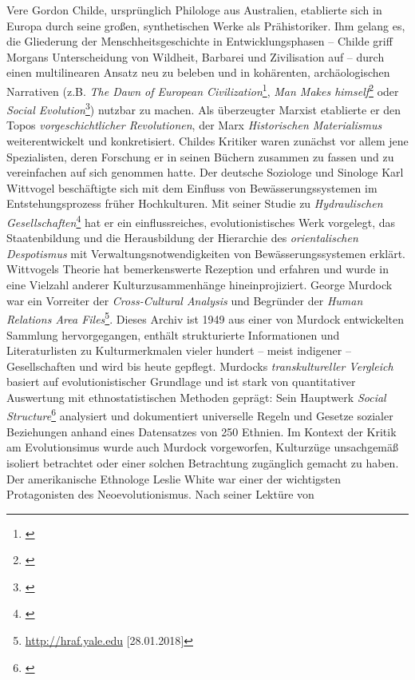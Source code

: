 \documentclass[openany,twoside,twocolumn]{book}
\let\rmarkdownfootnote\footnote%
\def\footnote{\protect\rmarkdownfootnote}
\begin{document}
Vere Gordon Childe, ursprünglich Philologe aus Australien, etablierte
sich in Europa durch seine großen, synthetischen Werke als
Prähistoriker. Ihm gelang es, die Gliederung der Menschheitsgeschichte
in Entwicklungsphasen -- Childe griff Morgans Unterscheidung von
Wildheit, Barbarei und Zivilisation auf -- durch einen multilinearen
Ansatz neu zu beleben und in kohärenten, archäologischen Narrativen
(z.B. \emph{The Dawn of European Civilization}\footnote{\textcite{childe_dawn_1925}},
\emph{Man Makes himself}\footnote{\textcite{childe_man_1936}} oder
\emph{Social Evolution}\footnote{\textcite{childe_social_1951}}) nutzbar
zu machen. Als überzeugter Marxist etablierte er den Topos
\emph{vorgeschichtlicher Revolutionen}, der Marx \emph{Historischen
Materialismus} weiterentwickelt und konkretisiert. Childes Kritiker
waren zunächst vor allem jene Spezialisten, deren Forschung er in seinen
Büchern zusammen zu fassen und zu vereinfachen auf sich genommen hatte.
Der deutsche Soziologe und Sinologe Karl Wittvogel beschäftigte sich mit
dem Einfluss von Bewässerungssystemen im Entstehungsprozess früher
Hochkulturen. Mit seiner Studie zu \emph{Hydraulischen
Gesellschaften}\footnote{\textcite{wittfogel_oriental_1957}} hat er ein
einflussreiches, evolutionistisches Werk vorgelegt, das Staatenbildung
und die Herausbildung der Hierarchie des \emph{orientalischen
Despotismus} mit Verwaltungsnotwendigkeiten von Bewässerungssystemen
erklärt. Wittvogels Theorie hat bemerkenswerte Rezeption und erfahren
und wurde in eine Vielzahl anderer Kulturzusammenhänge hineinprojiziert.
George Murdock war ein Vorreiter der \emph{Cross-Cultural Analysis} und
Begründer der \emph{Human Relations Area Files}\footnote{\url{http://hraf.yale.edu}
  {[}28.01.2018{]}}. Dieses Archiv ist 1949 aus einer von Murdock
entwickelten Sammlung hervorgegangen, enthält strukturierte
Informationen und Literaturlisten zu Kulturmerkmalen vieler hundert --
meist indigener -- Gesellschaften und wird bis heute gepflegt. Murdocks
\emph{transkultureller Vergleich} basiert auf evolutionistischer
Grundlage und ist stark von quantitativer Auswertung mit
ethnostatistischen Methoden geprägt: Sein Hauptwerk \emph{Social
Structure}\footnote{\textcite{murdock_social_1949}} analysiert und
dokumentiert universelle Regeln und Gesetze sozialer Beziehungen anhand
eines Datensatzes von 250 Ethnien. Im Kontext der Kritik am
Evolutionsimus wurde auch Murdock vorgeworfen, Kulturzüge unsachgemäß
isoliert betrachtet oder einer solchen Betrachtung zugänglich gemacht zu
haben. Der amerikanische Ethnologe Leslie White war einer der
wichtigsten Protagonisten des Neoevolutionismus. Nach seiner Lektüre von
\end{document}
